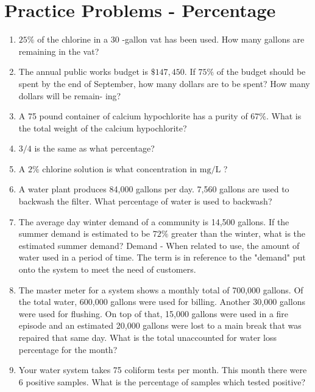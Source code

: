 \documentclass[10pt]{article}
\begin{document}
\begin{enumerate}
\begin{enumerate}
\begin{enumerate}
\end{enumerate}

\section{Practice Problems - Percentage}
\begin{enumerate}
  \item $25 \%$ of the chlorine in a 30 -gallon vat has been used. How many gallons are remaining in the vat?

  \item The annual public works budget is $\$ 147,450$. If $75 \%$ of the budget should be spent by the end of September, how many dollars are to be spent? How many dollars will be remain- ing?

  \item A 75 pound container of calcium hypochlorite has a purity of $67 \%$. What is the total weight of the calcium hypochlorite?

  \item $3 / 4$ is the same as what percentage?

  \item A $2 \%$ chlorine solution is what concentration in $\mathrm{mg} / \mathrm{L}$ ?

  \item A water plant produces 84,000 gallons per day. 7,560 gallons are used to backwash the filter. What percentage of water is used to backwash?

  \item The average day winter demand of a community is 14,500 gallons. If the summer demand is estimated to be $72 \%$ greater than the winter, what is the estimated summer demand? Demand - When related to use, the amount of water used in a period of time. The term is in reference to the "demand" put onto the system to meet the need of customers.

  \item The master meter for a system shows a monthly total of 700,000 gallons. Of the total water, 600,000 gallons were used for billing. Another 30,000 gallons were used for flushing. On top of that, 15,000 gallons were used in a fire episode and an estimated 20,000 gallons were lost to a main break that was repaired that same day. What is the total unaccounted for water loss percentage for the month?

  \item Your water system takes 75 coliform tests per month. This month there were 6 positive samples. What is the percentage of samples which tested positive?


\end{enumerate}
\end{enumerate}
\end{enumerate}
\end{document}
